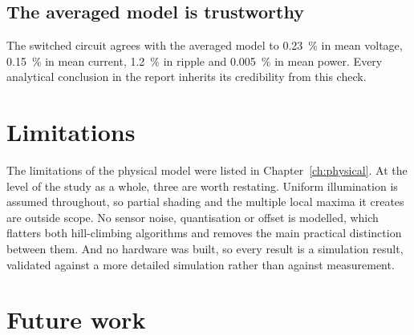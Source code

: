 \subsection{The averaged model is trustworthy}

The switched circuit agrees with the averaged model to \SI{0.23}{\percent} in
mean voltage, \SI{0.15}{\percent} in mean current, \SI{1.2}{\percent} in ripple
and \SI{0.005}{\percent} in mean power. Every analytical conclusion in the report
inherits its credibility from this check.

\section{Limitations}

The limitations of the physical model were listed in Chapter~\ref{ch:physical}.
At the level of the study as a whole, three are worth restating. Uniform
illumination is assumed throughout, so partial shading and the multiple local
maxima it creates are outside scope. No sensor noise, quantisation or offset is
modelled, which flatters both hill-climbing algorithms and removes the main
practical distinction between them. And no hardware was built, so every result
is a simulation result, validated against a more detailed simulation rather than
against measurement.

\section{Future work}

